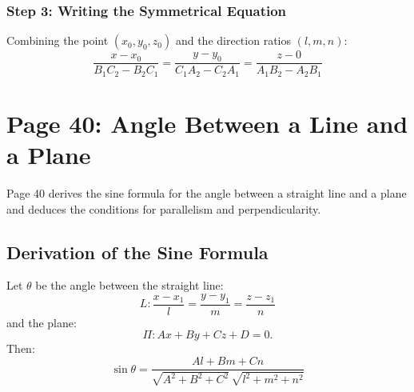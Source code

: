 \subsubsection{Step 3: Writing the Symmetrical Equation}
Combining the point $(x_0, y_0, z_0)$ and the direction ratios $(l, m, n)$:
\begin{equation}
    \boxed{\frac{x - x_0}{B_1 C_2 - B_2 C_1} = \frac{y - y_0}{C_1 A_2 - C_2 A_1} = \frac{z - 0}{A_1 B_2 - A_2 B_1}}
\end{equation}

\section{Page 40: Angle Between a Line and a Plane}
\label{sec:page40}

\begin{conceptbox}
Page 40 derives the sine formula for the angle between a straight line and a plane and deduces the conditions for parallelism and perpendicularity.
\end{conceptbox}

\subsection{Derivation of the Sine Formula}
\begin{theorembox}
Let $\theta$ be the angle between the straight line:
\begin{equation}
    L: \frac{x - x_1}{l} = \frac{y - y_1}{m} = \frac{z - z_1}{n}
\end{equation}
and the plane:
\begin{equation}
    \Pi: Ax + By + Cz + D = 0.
\end{equation}
Then:
\begin{equation}
    \boxed{\sin\theta = \frac{Al + Bm + Cn}{\sqrt{A^2 + B^2 + C^2}\,\sqrt{l^2 + m^2 + n^2}}}
\end{equation}
\end{theorembox}

